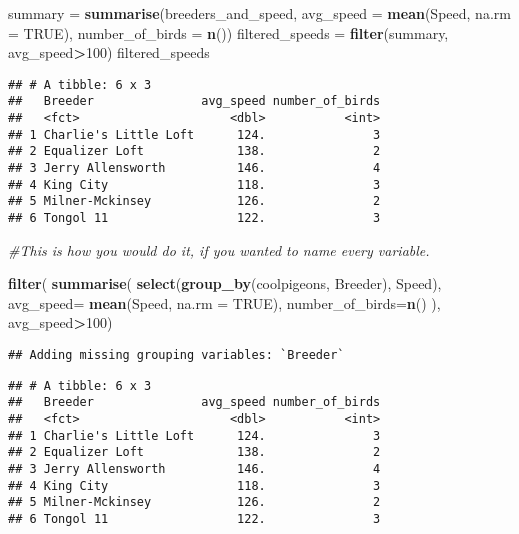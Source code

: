 \documentclass[]{article}
\newenvironment{Shaded}{\begin{snugshade}}{\end{snugshade}}
\newcommand{\KeywordTok}[1]{\textcolor[rgb]{0.13,0.29,0.53}{\textbf{#1}}}
\newcommand{\DataTypeTok}[1]{\textcolor[rgb]{0.13,0.29,0.53}{#1}}
\newcommand{\DecValTok}[1]{\textcolor[rgb]{0.00,0.00,0.81}{#1}}
\newcommand{\StringTok}[1]{\textcolor[rgb]{0.31,0.60,0.02}{#1}}
\newcommand{\CommentTok}[1]{\textcolor[rgb]{0.56,0.35,0.01}{\textit{#1}}}
\newcommand{\OtherTok}[1]{\textcolor[rgb]{0.56,0.35,0.01}{#1}}
\newcommand{\OperatorTok}[1]{\textcolor[rgb]{0.81,0.36,0.00}{\textbf{#1}}}
\newcommand{\NormalTok}[1]{#1}
\begin{document}
\begin{Shaded}
\begin{Highlighting}[]
\NormalTok{summary =}\StringTok{ }\KeywordTok{summarise}\NormalTok{(breeders_and_speed,}
      \DataTypeTok{avg_speed =} \KeywordTok{mean}\NormalTok{(Speed, }\DataTypeTok{na.rm =} \OtherTok{TRUE}\NormalTok{),}
      \DataTypeTok{number_of_birds =} \KeywordTok{n}\NormalTok{())}
\NormalTok{filtered_speeds =}\StringTok{ }\KeywordTok{filter}\NormalTok{(summary, avg_speed}\OperatorTok{>}\DecValTok{100}\NormalTok{)}
\NormalTok{filtered_speeds}
\end{Highlighting}
\end{Shaded}

\begin{verbatim}
## # A tibble: 6 x 3
##   Breeder               avg_speed number_of_birds
##   <fct>                     <dbl>           <int>
## 1 Charlie's Little Loft      124.               3
## 2 Equalizer Loft             138.               2
## 3 Jerry Allensworth          146.               4
## 4 King City                  118.               3
## 5 Milner-Mckinsey            126.               2
## 6 Tongol 11                  122.               3
\end{verbatim}

\begin{Shaded}
\begin{Highlighting}[]
\CommentTok{#This is how you would do it, if you wanted to name every variable.}
\end{Highlighting}
\end{Shaded}

\begin{Shaded}
\begin{Highlighting}[]
\KeywordTok{filter}\NormalTok{(}
  \KeywordTok{summarise}\NormalTok{(}
    \KeywordTok{select}\NormalTok{(}\KeywordTok{group_by}\NormalTok{(coolpigeons, Breeder), }
\NormalTok{           Speed),}
    \DataTypeTok{avg_speed=} \KeywordTok{mean}\NormalTok{(Speed, }\DataTypeTok{na.rm =} \OtherTok{TRUE}\NormalTok{),}
    \DataTypeTok{number_of_birds=}\KeywordTok{n}\NormalTok{()}
\NormalTok{    ),}
\NormalTok{  avg_speed}\OperatorTok{>}\DecValTok{100}\NormalTok{)}
\end{Highlighting}
\end{Shaded}

\begin{verbatim}
## Adding missing grouping variables: `Breeder`
\end{verbatim}

\begin{verbatim}
## # A tibble: 6 x 3
##   Breeder               avg_speed number_of_birds
##   <fct>                     <dbl>           <int>
## 1 Charlie's Little Loft      124.               3
## 2 Equalizer Loft             138.               2
## 3 Jerry Allensworth          146.               4
## 4 King City                  118.               3
## 5 Milner-Mckinsey            126.               2
## 6 Tongol 11                  122.               3
\end{verbatim}
\end{document}

